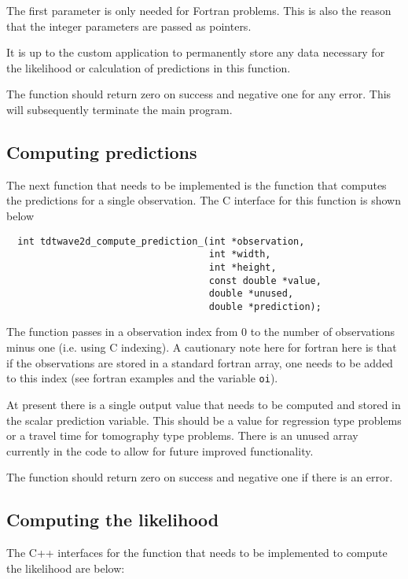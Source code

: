 \documentclass[a4paper,12pt]{article}
\begin{document}
The first parameter is only needed for Fortran problems. This is also the reason
that the integer parameters are passed as pointers.

It is up to the custom application to permanently store any data
necessary for the likelihood or calculation of predictions in this
function.

The function should return zero on success and negative one for any
error.  This will subsequently terminate the main program.

\subsection{Computing predictions}

The next function that needs to be implemented is the function that computes
the predictions for a single observation. The C interface for this function
is shown below


\begin{verbatim}
  int tdtwave2d_compute_prediction_(int *observation,
                                    int *width, 
                                    int *height,
                                    const double *value,
                                    double *unused,
                                    double *prediction);
\end{verbatim}

The function passes in a observation index from 0 to the number of
observations minus one (i.e. using C indexing). A cautionary note here
for fortran here is that if the observations are stored in a standard
fortran array, one needs to be added to this index (see fortran
examples and the variable {\tt oi}).

At present there is a single output value that needs to be computed and
stored in the scalar prediction variable. This should be a value for regression
type problems or a travel time for tomography type problems. There is an unused
array currently in the code to allow for future improved functionality.

The function should return zero on success and negative one if there
is an error.

\subsection{Computing the likelihood}

The C++ interfaces for the function that needs to be implemented to
compute the likelihood are below:
\end{document}
